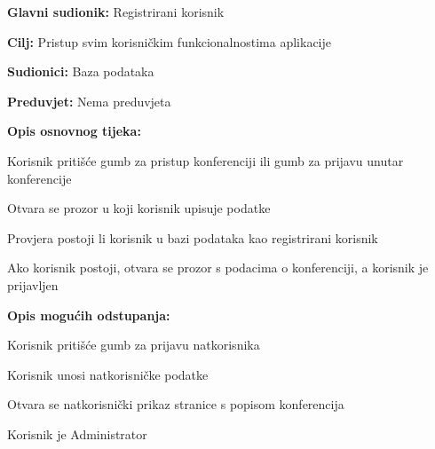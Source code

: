 					\noindent {}
					\begin{packed_item}
						
						\item \textbf{Glavni sudionik: } Registrirani korisnik
						\item  \textbf{Cilj:} Pristup svim korisničkim funkcionalnostima aplikacije
						\item  \textbf{Sudionici:} Baza podataka
						\item  \textbf{Preduvjet:} Nema preduvjeta
						\item  \textbf{Opis osnovnog tijeka:}
						
						\item[] \begin{packed_enum}
							
							\item Korisnik pritišće gumb za pristup konferenciji ili gumb za prijavu unutar konferencije
							\item Otvara se prozor u koji korisnik upisuje podatke
							\item Provjera postoji li korisnik u bazi podataka kao registrirani korisnik
							\item Ako korisnik postoji, otvara se prozor s podacima o konferenciji, a korisnik je prijavljen
							
						\end{packed_enum}
						
						\item  \textbf{Opis mogućih odstupanja:}
						
						\item[] \begin{packed_item}
							
							\item[1.a] Korisnik pritišće gumb za prijavu natkorisnika
							\item[] \begin{packed_enum}
								
								\item Korisnik unosi natkorisničke podatke
								\item Otvara se natkorisnički prikaz stranice s popisom konferencija
								
							\end{packed_enum}
							
							\item[3.a] Korisnik je Administrator
							\item[] \begin{packed_enum}
								

\end{packed_enum}
\end{packed_item}
\end{packed_item}
